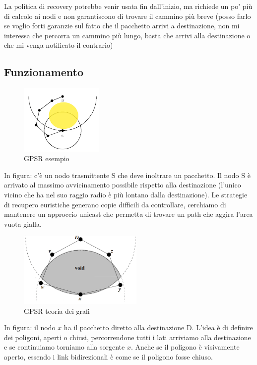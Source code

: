 \documentclass[12pt,italian]{report}
\begin{document}
La politica di recovery potrebbe venir usata fin dall'inizio, ma richiede un po' più di calcolo ai nodi e non garantiscono di trovare il cammino più breve (posso farlo se voglio forti garanzie sul fatto che il pacchetto arrivi a destinazione, non mi interessa che percorra un cammino più lungo, basta che arrivi alla destinazione o che mi venga notificato il contrario)
 
\subsection{Funzionamento}
\begin{figure}[h]
\centering
\includegraphics[width=40mm]{img/gpsr.PNG}
\caption{GPSR esempio}
\label{fig:fergerfrr}
\end{figure}
\noindent In figura: c'è un nodo trasmittente S che deve inoltrare un pacchetto. Il nodo S è arrivato al massimo avvicinamento possibile rispetto alla destinazione (l'unico vicino che ha nel suo raggio radio è più lontano dalla destinazione).
\bigbreak
Le strategie di recupero euristiche generano copie difficili da controllare, cerchiamo di mantenere un approccio unicast che permetta di trovare un path che aggira l'area vuota gialla. 
 \begin{figure}[h]
\centering
\includegraphics[width=60mm]{img/gpsr2.PNG}
\caption{GPSR teoria dei grafi}
\label{fig:fergerfrffr}
\end{figure}
\bigbreak
\noindent In figura: il nodo $x$ ha il pacchetto diretto alla destinazione D. 
\bigbreak
\noindent L'idea è di definire dei poligoni, aperti o chiusi, percorrendone tutti i lati arriviamo alla destinazione e se continuiamo torniamo alla sorgente $x$. Anche se il poligono è visivamente aperto, essendo i link bidirezionali è come se il poligono fosse chiuso. 
\bigbreak
\end{document}
